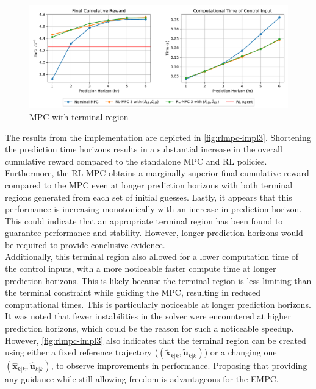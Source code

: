 \begin{figure}[H]
	\centering
	\includegraphics[width=\textwidth]{figures/rl_mpc_impl_3.pdf}
	\caption{MPC with terminal region}
	\label{fig:rlmpc-impl3}
\end{figure}

The results from the implementation are depicted in \autoref{fig:rlmpc-impl3}. Shortening the prediction time horizons results in a substantial increase in the overall cumulative reward compared to the standalone MPC and RL policies. Furthermore, the RL-MPC obtains a marginally superior final cumulative reward compared to the MPC even at longer prediction horizons with both terminal regions generated from each set of initial guesses. Lastly, it appears that this performance is increasing monotonically with an increase in prediction horizon. This could indicate that an appropriate terminal region has been found to  guarantee performance and stability. However, longer prediction horizons would be required to provide conclusive evidence.\\

Additionally, this terminal region also allowed for a lower computation time of the control inputs, with a more noticeable faster compute time at longer prediction horizons. This is likely because the terminal region is less limiting than the terminal constraint while guiding the MPC, resulting in reduced computational times. This is particularly noticeable at longer prediction horizons. It was noted that fewer instabilities in the solver were encountered at higher prediction horizons, which could be the reason for such a noticeable speedup. However, \autoref{fig:rlmpc-impl3} also indicates that the terminal region can be created using either a fixed reference trajectory ($(\tilde{\mathbf{x}}_{k|k}, \tilde{\mathbf{u}}_{k|k})$) or a changing one $(\hat{\mathbf{x}}_{k|k}, \hat{\mathbf{u}}_{k|k})$, to observe improvements in performance. Proposing that providing any guidance while still allowing freedom is advantageous for the EMPC.

